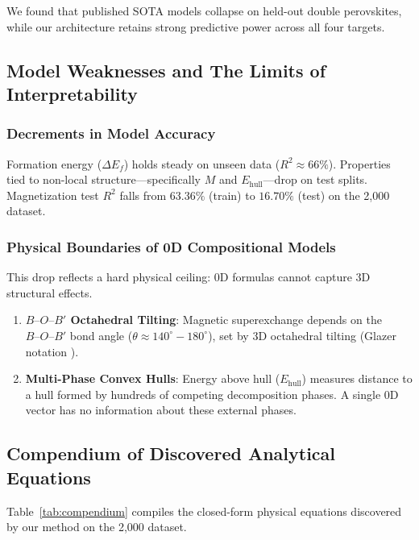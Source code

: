 \documentclass[journal=jcisd8,manuscript=article]{achemso}
\begin{document}
We found that published SOTA models collapse on held-out double perovskites, while our architecture retains strong predictive power across all four targets.

\subsection{Model Weaknesses and The Limits of Interpretability}

\subsubsection{Decrements in Model Accuracy}
Formation energy ($\Delta E_f$) holds steady on unseen data ($R^2 \approx 66\%$). Properties tied to non-local structure—specifically $M$ and $E_{\text{hull}}$—drop on test splits. Magnetization test $R^2$ falls from $63.36\%$ (train) to $16.70\%$ (test) on the 2,000 dataset.

\subsubsection{Physical Boundaries of 0D Compositional Models}
This drop reflects a hard physical ceiling: 0D formulas cannot capture 3D structural effects.
\begin{enumerate}
\item \textbf{$B\text{--}O\text{--}B'$ Octahedral Tilting}: Magnetic superexchange depends on the $B\text{--}O\text{--}B'$ bond angle ($\theta \approx 140^\circ - 180^\circ$), set by 3D octahedral tilting (Glazer notation \cite{woodward1997octahedral}).
\item \textbf{Multi-Phase Convex Hulls}: Energy above hull ($E_{\text{hull}}$) measures distance to a hull formed by hundreds of competing decomposition phases. A single 0D vector has no information about these external phases.
\end{enumerate}

\subsection{Compendium of Discovered Analytical Equations}
Table~\ref{tab:compendium} compiles the closed-form physical equations discovered by our method on the 2,000 dataset.
\end{document}
